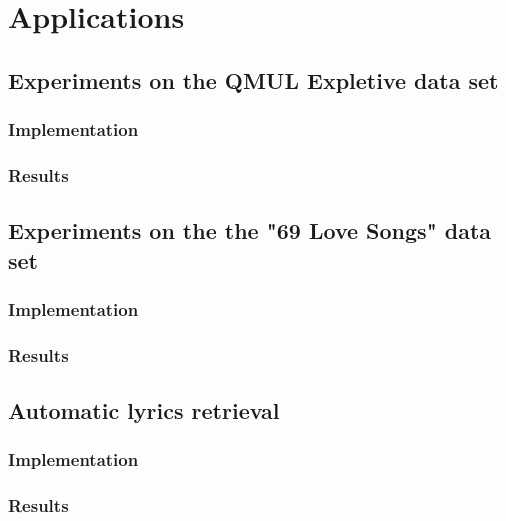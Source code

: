 \chapter{Applications} \label{chap:applications}
\section{Experiments on the QMUL Expletive data set}
\subsection{Implementation}
\subsection{Results}
\section{Experiments on the the "69 Love Songs" data set}
\subsection{Implementation}
\subsection{Results}
\section{Automatic lyrics retrieval}
\subsection{Implementation}
\subsection{Results}